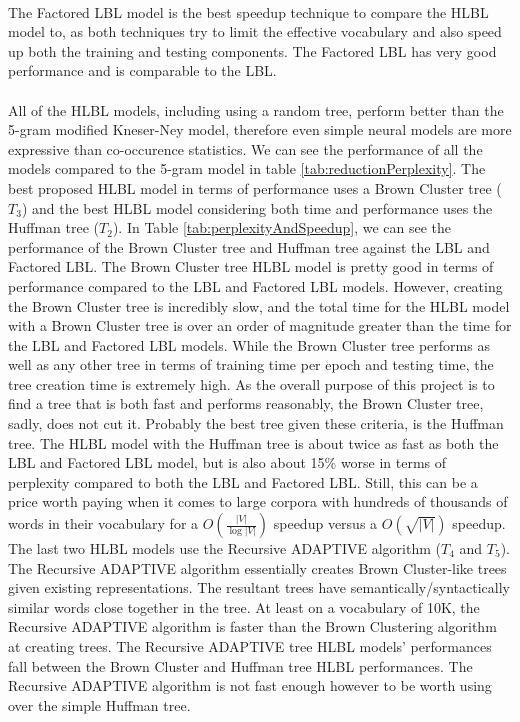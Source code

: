 \paragraph{}
The Factored LBL model is the best speedup technique to compare the HLBL model to, as both techniques try to limit the effective vocabulary and also speed up both the training and testing components. The Factored LBL has very good performance and is comparable to the LBL.

\paragraph{}
All of the HLBL models, including using a random tree, perform better than the 5-gram modified Kneser-Ney model,  therefore even simple neural models are more expressive than co-occurence statistics. We can see the performance of all the models compared to the 5-gram model in table \ref{tab:reductionPerplexity}. The best proposed HLBL model in terms of performance uses a Brown Cluster tree ($T_3$) and the best HLBL model considering both time and performance uses the Huffman tree ($T_2$). In Table \ref{tab:perplexityAndSpeedup}, we can see the performance of the Brown Cluster tree and Huffman tree against the LBL and Factored LBL. The Brown Cluster tree HLBL model is pretty good in terms of performance compared to the LBL and Factored LBL models. However, creating the Brown Cluster tree is incredibly slow, and the total time for the HLBL model with a Brown Cluster tree is over an order of magnitude greater than the time for the LBL and Factored LBL models. While the Brown Cluster tree performs as well as any other tree in terms of training time per epoch and testing time, the tree creation time is extremely high. As the overall purpose of this project is to find a tree that is both fast and performs reasonably, the Brown Cluster tree, sadly, does not cut it. Probably the best tree given these criteria, is the Huffman tree. The HLBL model with the Huffman tree is about twice as fast as both the LBL and Factored LBL model, but is also about 15\% worse in terms of perplexity compared to both the LBL and Factored LBL. Still, this can be a price worth paying when it comes to large corpora with hundreds of thousands of words in their vocabulary for a $O(\frac{|V|}{\log|V|})$ speedup versus a $O(\sqrt{|V|})$ speedup. The last two HLBL models use the Recursive ADAPTIVE algorithm ($T_4$ and $T_5$). The Recursive ADAPTIVE algorithm essentially creates Brown Cluster-like trees given existing representations. The resultant trees have semantically/syntactically similar words close together in the tree. At least on a vocabulary of 10K, the Recursive ADAPTIVE algorithm is faster than the Brown Clustering algorithm at creating trees. The Recursive ADAPTIVE tree HLBL models' performances fall between the Brown Cluster and Huffman tree HLBL performances. The Recursive ADAPTIVE algorithm is not fast enough however to be worth using over the simple Huffman tree. 

